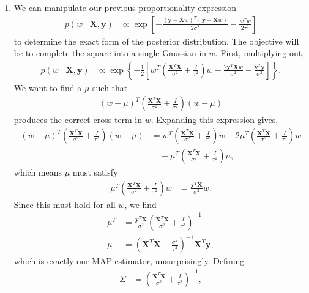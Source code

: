 \documentclass[11pt,letterpaper]{article}
\theoremstyle{definition}
\theoremstyle{plain}
\newcommand{\prop}{\mathrel{\propto}}
\renewcommand{\vec}[1]{\bm{#1}}
\numberwithin{equation}{section}
\numberwithin{figure}{section}
\begin{document}
\begin{enumerate}
\begin{enumerate}
		\item We can manipulate our previous proportionality expression
		\begin{align*}
			p(w\mid \vec{X},\vec{y}) &\prop \exp\left[-\frac{(\vec{y} - \vec{X}w)^T(\vec{y} - \vec{X}w)}{2\sigma^2} - \frac{w^T w}{2\tau^2}\right]
		\end{align*}
		to determine the exact form of the posterior distribution. The objective will be to complete the square into a single Gaussian in $w$. First, multiplying out,
		\begin{align*}
			p(w\mid \vec{X},\vec{y}) &\prop \exp\left\{-\frac{1}{2}\left[w^T \left(\frac{\vec{X}^T \vec{X}}{\sigma^2} + \frac{I}{\tau^2}\right)w - \frac{2\vec{y}^T \vec{X} w}{\sigma^2} - \frac{\vec{y}^T \vec{y}}{\sigma^2}\right]\right\}.
		\end{align*}
		We want to find a $\mu$ such that
		\begin{align*}
			(w-\mu)^T \left(\frac{\vec{X}^T \vec{X}}{\sigma^2} + \frac{I}{\tau^2}\right) (w-\mu)
		\end{align*}
		produces the correct cross-term in $w$. Expanding this expression gives,
		\begin{align*}
			(w-\mu)^T \left(\frac{\vec{X}^T \vec{X}}{\sigma^2} + \frac{I}{\tau^2}\right) (w-\mu) &= w^T \left(\frac{\vec{X}^T \vec{X}}{\sigma^2} + \frac{I}{\tau^2}\right)w - 2\mu^T \left(\frac{\vec{X}^T \vec{X}}{\sigma^2} + \frac{I}{\tau^2}\right) w\\&\quad + \mu^T \left(\frac{\vec{X}^T \vec{X}}{\sigma^2} + \frac{I}{\tau^2}\right) \mu,
		\end{align*}
		which means $\mu$ must satisfy
		\begin{align*}
			\mu^T \left(\frac{\vec{X}^T \vec{X}}{\sigma^2} + \frac{I}{\tau^2}\right) w &= \frac{\vec{y}^T \vec{X}}{\sigma^2} w.
		\end{align*}
		Since this must hold for all $w$, we find
		\begin{align*}
			\mu^T &=  \frac{\vec{y}^T \vec{X}}{\sigma^2}\left(\frac{\vec{X}^T \vec{X}}{\sigma^2} + \frac{I}{\tau^2}\right)^{-1}\\
			\mu &= \left(\vec{X}^T \vec{X} + \frac{\sigma^2}{\tau^2}\right)^{-1} \vec{X}^T \vec{y},
		\end{align*}
		which is exactly our MAP estimator, unsurprisingly. Defining
		\begin{align*}
			\Sigma &= \left(\frac{\vec{X}^T \vec{X}}{\sigma^2} + \frac{I}{\tau^2}\right)^{-1},
		\end{align*}

\end{enumerate}
\end{enumerate}
\end{document}
